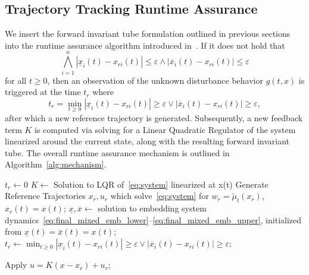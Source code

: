 \documentclass{IEEEojcsys}
\newcommand{\ul}{\underline}
\newcommand{\ol}{\overline}
\begin{document}


\subsection{Trajectory Tracking Runtime Assurance}
We insert the forward invariant tube formulation outlined in previous sections into the runtime assurance algorithm introduced in~\cite{caoICRARTA}. If it does not hold that
\begin{equation}
    \bigwedge_{i = 1}^{n} |\ul{x}_i(t) - x_{ri}(t)| \leq \varepsilon \wedge |\ol{x}_i(t) - x_{ri}(t)| \leq \varepsilon
\end{equation}
for all $t \geq 0$, then an observation of the unknown disturbance behavior $g(t, x)$ is triggered at the time $t_r$ where
\begin{equation}
    t_r = \min_{t \geq 0} |\ul{x}_i(t) - x_{ri}(t)| \geq \varepsilon \vee |\ol{x}_i(t) - x_{ri}(t)| \geq \varepsilon,
    \label{eq:t_r}
\end{equation}
after which a new reference trajectory is generated. Subsequently, a new feedback term $K$ is computed via solving for a Linear Quadratic Regulator of the system linearized around the current state, along with the resulting forward invariant tube. The overall runtime assurance mechanism is outlined in Algorithm~\ref{alg:mechanism}. 

\begin{algorithm}
\caption{Runtime Assurance Mechanism}
\label{alg:mechanism}
\begin{algorithmic}[1]
\State{}

\State$t_r \gets 0$
\State $K \gets$ Solution to LQR of~\eqref{eq:system} linearized at x(t)
\State Generate Reference Trajectories $x_r, u_r$ which solve~\eqref{eq:system} for $w_r = \widetilde{\mu}_t(x_r)$, $x_r(t) = x(t)$;
\State $\ul{x}, \ol{x} \gets$ solution to embedding system dynamics~\eqref{eq:final_mixed_emb_lower}--\eqref{eq:final_mixed_emb_upper}, initialized from $\ul{x}(t) = \ol{x}(t) = x(t)$;
\State $t_r \gets \min_{t \geq 0} |\ul{x}_i(t) - x_{ri}(t)| \geq \varepsilon \vee |\ol{x}_i(t) - x_{ri}(t)| \geq \varepsilon$;

\EndIf
\State Apply $u = K(x - x_r) + u_r$;
\EndWhile

\end{algorithmic}
\end{algorithm}
\end{document}
